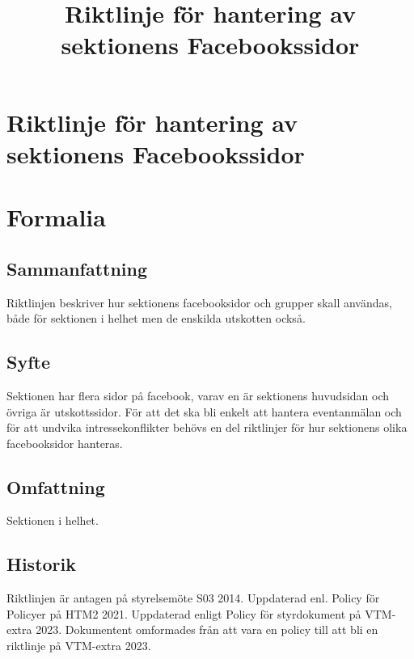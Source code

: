 \documentclass{dsekprotokoll}
\title{Riktlinje för hantering av sektionens Facebookssidor}
\author{}
\begin{document}
\section*{Riktlinje för hantering av sektionens Facebookssidor}
\section{Formalia}
\subsection{Sammanfattning}
Riktlinjen beskriver hur sektionens facebooksidor och grupper skall användas, både för sektionen i helhet men de enskilda utskotten också.
\subsection{Syfte}
Sektionen har flera sidor på facebook, varav en är sektionens huvudsidan och övriga är utskottssidor. För att det ska bli enkelt att hantera eventanmälan och för att undvika intressekonflikter behövs en del riktlinjer för hur sektionens olika facebooksidor hanteras.
\subsection{Omfattning}
Sektionen i helhet.
\subsection{Historik}
Riktlinjen är antagen på styrelsemöte S03 2014.
Uppdaterad enl. Policy för Policyer på HTM2 2021. Uppdaterad enligt Policy för styrdokument på VTM-extra 2023. Dokumentent omformades från att vara en policy till att bli en riktlinje på VTM-extra 2023.
\end{document}
